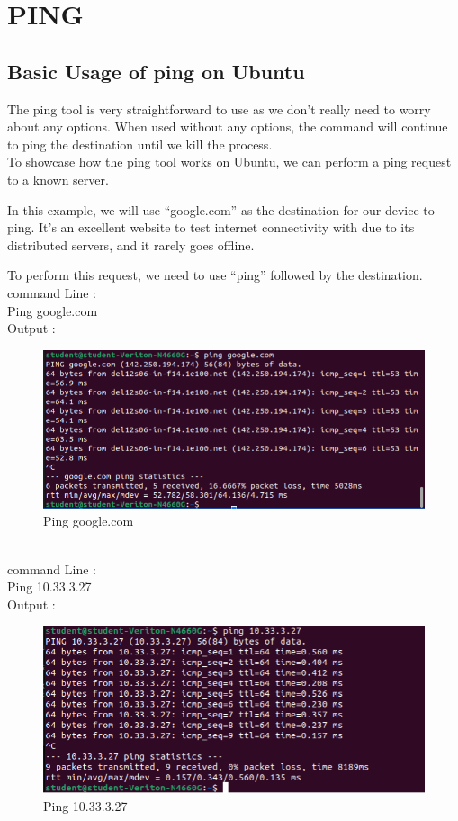 \documentclass[11pt]{article}
\begin{document}
\section{PING}
\subsection{Basic Usage of ping on Ubuntu}
The ping tool is very straightforward to use as we don’t really need to worry about any options. When used without any options, the command will continue to ping the destination until we kill the process.\\[12pt]
To showcase how the ping tool works on Ubuntu, we can perform a ping request to a known server.

In this example, we will use “google.com” as the destination for our device to ping. It’s an excellent website to test internet connectivity with due to its distributed servers, and it rarely goes offline.

To perform this request, we need to use “ping” followed by the destination.\\[12pt]
command Line :\\[6pt]
  Ping google.com\\[12pt]
  Output : 
  \begin{figure}[!h]
\centering
\includegraphics[width=\textwidth]{ping_google.png}
\caption{Ping google.com}
\end{figure}
\\[12pt]
command Line :\\[6pt]
  Ping 10.33.3.27\\[42pt]
  Output : 
  \begin{figure}[!h]
\centering
\includegraphics[width=\textwidth]{pin_ip.png}
\caption{Ping 10.33.3.27}
\end{figure}
  
\end{document}

